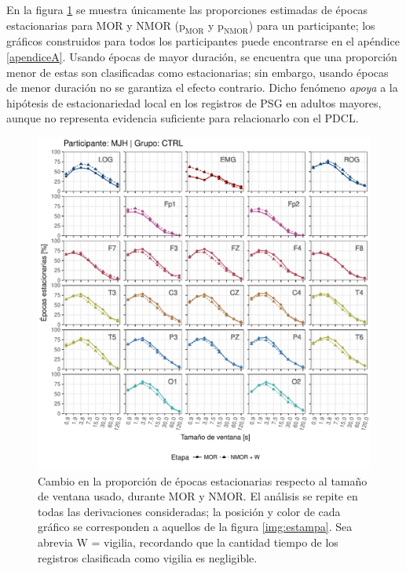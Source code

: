 En la figura \ref{cabeza_repoio} se muestra únicamente las proporciones estimadas de épocas estacionarias para MOR y NMOR ($\text{p}_{\text{MOR}}$ y $\text{p}_{\text{NMOR}}$) para un participante; los gráficos construidos para todos los participantes puede encontrarse en el apéndice \ref{apendiceA}.
%
Usando épocas de mayor duración, se encuentra que una proporción menor de estas son clasificadas como estacionarias; sin embargo, usando épocas de menor duración no se garantiza el efecto contrario.
%
Dicho fenómeno \textit{apoya} a la hipótesis de estacionariedad local en los registros de PSG en adultos mayores, aunque no representa evidencia suficiente para relacionarlo con el PDCL.

\begin{figure}
\centering
\includegraphics[width=\linewidth]{./scripts_graf_res/MJNNVIGILOS_cabeza_epocas_v2.pdf}
\caption{Cambio en la proporción de épocas estacionarias respecto al tamaño de ventana usado, durante MOR y NMOR. El análisis se repite en todas las derivaciones consideradas; la posición y color de cada gráfico se corresponden a aquellos de la figura \ref{img:estampa}. Sea abrevia W = vigilia, recordando que la cantidad tiempo de los registros clasificada como vigilia es negligible.}
\label{cabeza_repoio}
\end{figure}

